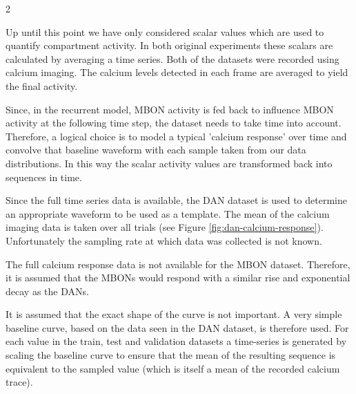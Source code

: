 \documentclass[11pt, A4]{article}
\begin{document}
\begin{multicols}{2}

Up until this point we have only considered scalar values which are used to quantify compartment activity. In both original experiments these scalars are calculated by averaging a time series. Both of the datasets were recorded using calcium imaging. The calcium levels detected in each frame are averaged to yield the final activity. 



Since, in the recurrent model, MBON activity is fed back to influence MBON activity at the following time step, the dataset needs to take time into account. Therefore, a logical choice is to model a typical 'calcium response' over time and convolve that baseline waveform with each sample taken from our data distributions. In this way the scalar activity values are transformed back into sequences in time. 

Since the full time series data is available, the DAN dataset is used to determine an appropriate waveform to be used as a template. The mean of the calcium imaging data is taken over all trials (see Figure \ref{fig:dan-calcium-response}). Unfortunately the sampling rate at which data was collected is not known.


The full calcium response data is not available for the MBON dataset. Therefore, it is assumed that the MBONs would respond with a similar rise and exponential decay as the DANs.

It is assumed that the exact shape of the curve is not important. A very simple baseline curve, based on the data seen in the DAN dataset, is therefore used. For each value in the train, test and validation datasets a time-series is generated by scaling the baseline curve to ensure that the mean of the resulting sequence is equivalent to the sampled value (which is itself a mean of the recorded calcium trace).


\end{multicols}
\end{document}
